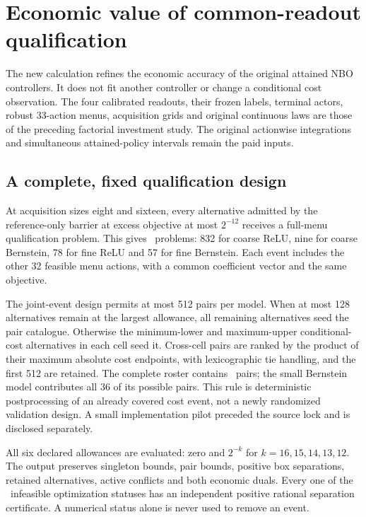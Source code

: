 \section{Economic value of common-readout qualification}\label{sec:study84}

The new calculation refines the economic accuracy of the original attained NBO controllers. It does not fit another controller or change a conditional cost observation. The four calibrated readouts, their frozen labels, terminal actors, robust 33-action menus, acquisition grids and original continuous laws are those of the preceding factorial investment study. The original actionwise integrations and simultaneous attained-policy intervals remain the paid inputs.

\subsection{A complete, fixed qualification design}
At acquisition sizes eight and sixteen, every alternative admitted by the reference-only barrier at excess objective at most $2^{-12}$ receives a full-menu qualification problem. This gives \FullMenuProblems\ problems: 832 for coarse ReLU, nine for coarse Bernstein, 78 for fine ReLU and 57 for fine Bernstein. Each event includes the other 32 feasible menu actions, with a common coefficient vector and the same objective.

The joint-event design permits at most 512 pairs per model. When at most 128 alternatives remain at the largest allowance, all remaining alternatives seed the pair catalogue. Otherwise the minimum-lower and maximum-upper conditional-cost alternatives in each cell seed it. Cross-cell pairs are ranked by the product of their maximum absolute cost endpoints, with lexicographic tie handling, and the first 512 are retained. The complete roster contains \JointProblems\ pairs; the small Bernstein model contributes all 36 of its possible pairs. This rule is deterministic postprocessing of an already covered cost event, not a newly randomized validation design. A small implementation pilot preceded the source lock and is disclosed separately.

All six declared allowances are evaluated: zero and $2^{-k}$ for $k=16,15,14,13,12$. The output preserves singleton bounds, pair bounds, positive box separations, retained alternatives, active conflicts and both economic duals. Every one of the \ExactInfeasible\ infeasible optimization statuses has an independent positive rational separation certificate. A numerical status alone is never used to remove an event.

